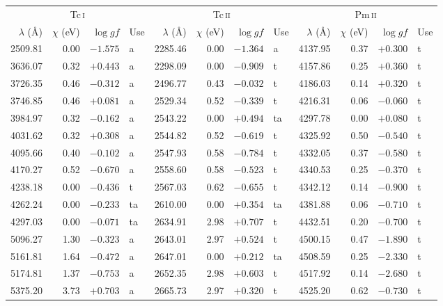 \begin{tabular}{rrrl@{\hspace{10pt}}rrrl@{\hspace{10pt}}rrrl}
\toprule
\multicolumn{4}{c}{Tc\,\textsc{i}} & \multicolumn{4}{c}{Tc\,\textsc{ii}} & \multicolumn{4}{c}{Pm\,\textsc{ii}} \\
\cmidrule(lr){1-4}\cmidrule(lr){5-8}\cmidrule(lr){9-12}
$\lambda$ (\AA) & $\chi$ (eV) & $\log gf$ & Use & $\lambda$ (\AA) & $\chi$ (eV) & $\log gf$ & Use & $\lambda$ (\AA) & $\chi$ (eV) & $\log gf$ & Use \\
\midrule
2509.81 & 0.00 & $-1.575$ & a & 2285.46 & 0.00 & $-1.364$ & a & 4137.95 & 0.37 & $+0.300$ & t \\
3636.07 & 0.32 & $+0.443$ & a & 2298.09 & 0.00 & $-0.909$ & t & 4157.86 & 0.25 & $+0.360$ & t \\
3726.35 & 0.46 & $-0.312$ & a & 2496.77 & 0.43 & $-0.032$ & t & 4186.03 & 0.14 & $+0.320$ & t \\
3746.85 & 0.46 & $+0.081$ & a & 2529.34 & 0.52 & $-0.339$ & t & 4216.31 & 0.06 & $-0.060$ & t \\
3984.97 & 0.32 & $-0.162$ & a & 2543.22 & 0.00 & $+0.494$ & ta & 4297.78 & 0.00 & $+0.080$ & t \\
4031.62 & 0.32 & $+0.308$ & a & 2544.82 & 0.52 & $-0.619$ & t & 4325.92 & 0.50 & $-0.540$ & t \\
4095.66 & 0.40 & $-0.102$ & a & 2547.93 & 0.58 & $-0.784$ & t & 4332.05 & 0.37 & $-0.580$ & t \\
4170.27 & 0.52 & $-0.670$ & a & 2558.60 & 0.58 & $-0.523$ & t & 4340.53 & 0.25 & $-0.370$ & t \\
4238.18 & 0.00 & $-0.436$ & t & 2567.03 & 0.62 & $-0.655$ & t & 4342.12 & 0.14 & $-0.900$ & t \\
4262.24 & 0.00 & $-0.233$ & ta & 2610.00 & 0.00 & $+0.354$ & ta & 4381.88 & 0.06 & $-0.710$ & t \\
4297.03 & 0.00 & $-0.071$ & ta & 2634.91 & 2.98 & $+0.707$ & t & 4432.51 & 0.20 & $-0.700$ & t \\
5096.27 & 1.30 & $-0.323$ & a & 2643.01 & 2.97 & $+0.524$ & t & 4500.15 & 0.47 & $-1.890$ & t \\
5161.81 & 1.64 & $-0.472$ & a & 2647.01 & 0.00 & $+0.212$ & ta & 4508.59 & 0.25 & $-2.330$ & t \\
5174.81 & 1.37 & $-0.753$ & a & 2652.35 & 2.98 & $+0.603$ & t & 4517.92 & 0.14 & $-2.680$ & t \\
5375.20 & 3.73 & $+0.703$ & a & 2665.73 & 2.97 & $+0.320$ & t & 4525.20 & 0.62 & $-0.730$ & t \\

\end{tabular}
